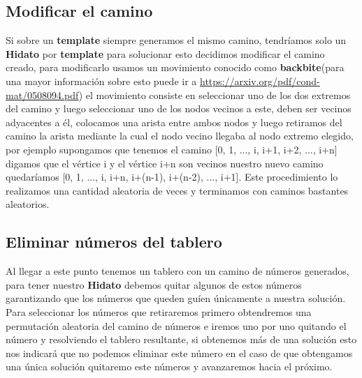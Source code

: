 \documentclass[12pt]{article}
\begin{document}
\subsection{Modificar el camino}
Si sobre un {\bf template} siempre generamos el mismo camino, tendr\'iamos solo un {\bf Hidato} por {\bf template} para solucionar esto decidimos modificar el camino creado, para modificarlo usamos un movimiento conocido como {\bf backbite}(para una mayor informaci\'on sobre esto puede ir a   \url{https://arxiv.org/pdf/cond-mat/0508094.pdf}) el movimiento consiste
en seleccionar uno de los dos extremos del camino y luego seleccionar uno de los nodos vecinos a este, deben ser vecinos adyacentes a \'el, colocamos una arista entre ambos nodos y luego retiramos del camino la arista mediante la cual el nodo vecino llegaba al nodo extremo elegido,
por ejemplo supongamos que tenemos el camino [0, 1, ..., i, i+1, i+2, ..., i+n] digamos que el v\'ertice i y el v\'ertice i+n son vecinos nuestro nuevo camino quedar\'iamos
[0, 1, ..., i, i+n, i+(n-1), i+(n-2), ..., i+1]. Este procedimiento lo realizamos una cantidad aleatoria de veces y terminamos con caminos bastantes aleatorios.
\subsection{Eliminar n\'umeros del tablero}
Al llegar a este punto tenemos un tablero con un camino de n\'umeros generados, para tener nuestro {\bf Hidato} debemos quitar algunos de estos n\'umeros garantizando que los n\'umeros que queden gu\'ien \'unicamente a nuestra soluci\'on.
Para seleccionar los n\'umeros que retiraremos primero obtendremos una permutaci\'on aleatoria del camino de n\'umeros e iremos uno por uno quitando el n\'umero y resolviendo el tablero resultante, si obtenemos m\'as de una soluci\'on esto nos indicar\'a que no podemos eliminar este n\'umero en el caso de que obtengamos una \'unica
soluci\'on quitaremo este n\'umeros y avanzaremos hacia el pr\'oximo.
\end{document}
